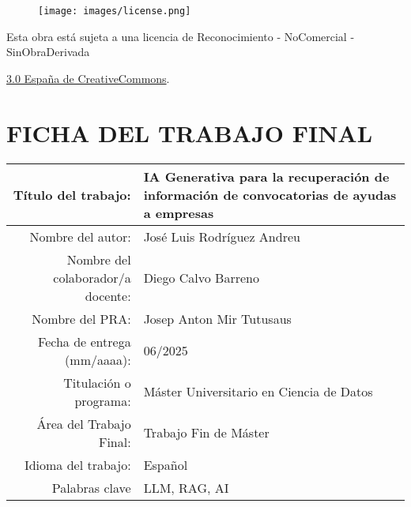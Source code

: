 \setcounter{page}{1} 
\pagestyle{plain}




\vspace{1cm}

\begin{figure}[ht]
    \centering
	\texttt{[image: images/license.png]}
\end{figure}

Esta obra está sujeta a una licencia de Reconocimiento -  NoComercial - SinObraDerivada

\href{https://creativecommons.org/licenses/by-nc-nd/3.0/es/}{3.0 España de CreativeCommons}.

\chapter*{FICHA DEL TRABAJO FINAL}

\begin{table}[ht]
	\centering{}
	\renewcommand{\arraystretch}{2}
	\begin{tabular}{r | p{10cm}}
		\hline
		Título del trabajo: & IA Generativa para la recuperación 
		de información de convocatorias de ayudas a empresas\\
		\hline
        Nombre del autor: & José Luis Rodríguez Andreu\\
		\hline
        Nombre del colaborador/a docente: & Diego Calvo Barreno\\
		\hline
        Nombre del PRA: & Josep Anton Mir Tutusaus\\
		\hline
        Fecha de entrega (mm/aaaa): & 06/2025\\
		\hline
        Titulación o programa: & Máster Universitario en Ciencia de Datos\\
		\hline
        Área del Trabajo Final: & Trabajo Fin de Máster\\
		\hline
        Idioma del trabajo: & Español\\
		\hline
        Palabras clave & LLM, RAG, AI\\
		\hline
	\end{tabular}
\end{table}

